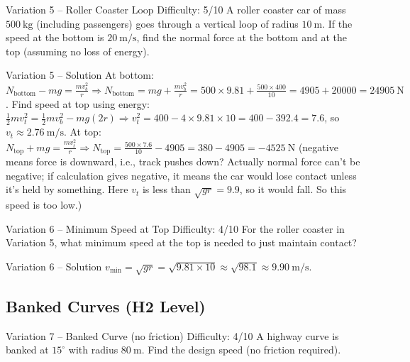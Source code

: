 \documentclass[11pt]{beamer}
\begin{document}
\begin{frame}[shrink=15]{Variation 5 – Roller Coaster Loop \hfill Difficulty: 5/10}
A roller coaster car of mass $500\ \mathrm{kg}$ (including passengers) goes through a vertical loop of radius $10\ \mathrm{m}$. If the speed at the bottom is $20\ \mathrm{m/s}$, find the normal force at the bottom and at the top (assuming no loss of energy).
\end{frame}

\begin{frame}{Variation 5 – Solution}
At bottom: $N_{\text{bottom}} - mg = \frac{mv_b^2}{r} \Rightarrow N_{\text{bottom}} = mg + \frac{mv_b^2}{r} = 500\times9.81 + \frac{500\times400}{10} = 4905 + 20000 = 24905\ \mathrm{N}$.
Find speed at top using energy: $\frac12 m v_t^2 = \frac12 m v_b^2 - mg(2r) \Rightarrow v_t^2 = 400 - 4\times9.81\times10 = 400 - 392.4 = 7.6$, so $v_t \approx 2.76\ \mathrm{m/s}$.
At top: $N_{\text{top}} + mg = \frac{mv_t^2}{r} \Rightarrow N_{\text{top}} = \frac{500\times7.6}{10} - 4905 = 380 - 4905 = -4525\ \mathrm{N}$ (negative means force is downward, i.e., track pushes down? Actually normal force can't be negative; if calculation gives negative, it means the car would lose contact unless it's held by something. Here $v_t$ is less than $\sqrt{gr}=9.9$, so it would fall. So this speed is too low.)
\end{frame}

\begin{frame}[shrink=15]{Variation 6 – Minimum Speed at Top \hfill Difficulty: 4/10}
For the roller coaster in Variation 5, what minimum speed at the top is needed to just maintain contact?
\end{frame}

\begin{frame}{Variation 6 – Solution}
$v_{\min} = \sqrt{gr} = \sqrt{9.81\times10} \approx \sqrt{98.1} \approx 9.90\ \mathrm{m/s}$.
\end{frame}

\subsection{Banked Curves (H2 Level)}

\begin{frame}[shrink=15]{Variation 7 – Banked Curve (no friction) \hfill Difficulty: 4/10}
A highway curve is banked at $15^\circ$ with radius $80\ \mathrm{m}$. Find the design speed (no friction required).
\end{frame}
\end{document}
